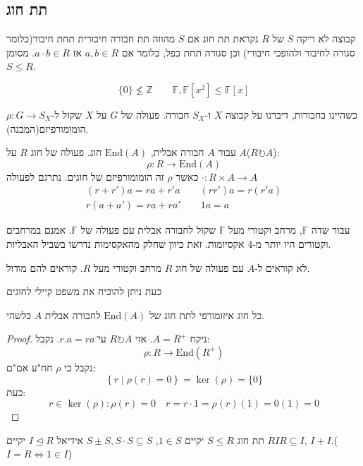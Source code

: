 \documentclass{tstextbook}
\begin{document}
\subsection{תת חוג}

\begin{definition}[תת חוג]
קבוצה לא ריקה \(S\) של \(R\) נקראת תת חוג אם \(S\) מהווה תת חבורה חיבורית תחת חיבור(כלומר סגורה לחיבור ולהופכי חיבורי) וכן סגורה תחת כפל, כלומר אם \(a,b\in R\) אז \(a\cdot b \in R\). מסומן \(S\leq R\).

\end{definition}
\begin{example}
$$\{ 0 \}\not\leq \mathbb{Z} \qquad \mathbb{F},\mathbb{F}[x^2]\leq \mathbb{F}[x]$$

\end{example}
\begin{reminder}
כשהיינו בחבורות, דיברנו על קבוצה \(X\) ו-\(S_{X}\) חבורה. פעולה של \(G\) על \(X\) שקול ל-\(\rho:G\to S_{X}\) הומומורפיזם(המבנה).

\end{reminder}
\begin{definition}
עבור \(A\) חבורה אבלית, \(\mathrm{End}(A)\) חוג. פעולה של חוג \(R\) על \(A\)(\(R \circlearrowright A\)): $$\rho:R\to \mathrm{End}(A)$$ כאשר \(\rho\) זה הומומורפיזם של חוגים. נתרגם לפעולה \(\cdot:R\times A\to A\)$$\begin{gathered}(r+r')a=ra+r'a\qquad (rr')a=r(r'a) \\r(a+a')=ra+ra'\qquad 1a=a
\end{gathered}$$

\end{definition}
עבור שדה \(\mathbb{F}\), מרחב וקטורי מעל \(\mathbb{F}\) שקול לחבורה אבלית עם פעולה של \(\mathbb{F}\). אמנם במרחבים וקטורים היו יותר מ-\(4\) אקסיומות. זאת כיוון שחלק מהאקסימות נדרשו בשביל האבליות.

\begin{remark}
לא קוראים ל-\(A\) עם פעולה של חוג \(R\) מרחב וקטורי מעל \(R\). קוראים להם מודול.

\end{remark}
כעת ניתן להוכיח את משפט קיילי לחוגים

\begin{reminder}
כל חוג איזומורפי לתת חוג של \(\mathrm{End}(A)\) לחבורה אבלית \(A\) כלשהי.

\end{reminder}
\begin{proof}
ניקח \(A=R^+\). אזי \(R\circlearrowright A\) ע\"י \(r.a=ra\). נקבל:
$$\rho:R\to \mathrm{End}(R^+)$$
נקבל כי \(\rho\) חח"ע אם"ם:
$$\left\{  r \mid \rho(r)=0  \right\}=\ker\left( \rho \right)=\{ 0 \}$$
כעת:
$$r\in \ker\left( \rho \right):\rho(r)=0\quad r=r\cdot 1=\rho(r)(1)=0(1)=0$$

\end{proof}
תת חוג \(S\leq R\) יקיים \(1\in S\), \(S\pm S, S\cdot S\subseteq S\) אידיאל \(I\trianglelefteq R\) יקיים \(RIR\subseteq I\), \(I+I\).(\(I=R\iff 1\in I\))
\end{document}
